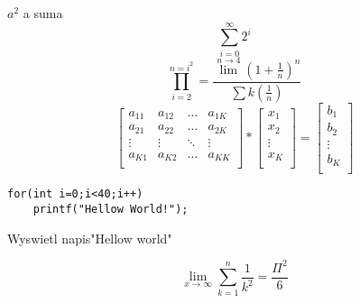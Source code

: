 \documentclass{article}
\begin{document}
$a^2$ a suma
\begin {displaymath}
	\sum_{i=0}^{\infty}{2^i}
\end {displaymath}
\begin {equation}
\label{eq:iloczyn}
	\prod_{i=2}^{n=i^2}=\frac{\lim^{n\rightarrow4}(1+\frac{1}{n})^n}{\sum{k(\frac{1}{n})}}
\end {equation}
\begin{equation}
\left[ \begin{array}{cccc}
a_{11} & a_{12} & \ldots & a_{1K} \\
a_{21} & a_{22} & \ldots & a_{2K}\\
\vdots & \vdots & \ddots & \vdots \\
a_{K1} & a_{K2} & \ldots & a_{KK}\\
\end{array} 
\right]
*
\left[ \begin{array}{c}
x_{1}  \\
x_{2} \\
\vdots  \\
x_{K} \\
\end{array} 
\right]
=
\left[ \begin{array}{c}
b_{1}  \\
b_{2} \\
\vdots  \\
b_{K} \\
\end{array} \right]
\end{equation}
\begin{verbatim}
for(int i=0;i<40;i++)
	printf("Hellow World!");
\end{verbatim}
\begin{algorithmic}
	\item{Wyswietl napis"Hellow world"}
\ENDFOR
\end{algorithmic}
\begin{displaymath}
		\lim_{x \to \infty} \sum_{k=1}^{n} \frac{1}{k^2} = \frac{\Pi^2}{6}
\end{displaymath}
\end{document}
